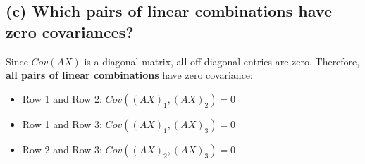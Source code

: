 \documentclass[11pt]{article}
\begin{document}
\subsection*{(c) Which pairs of linear combinations have zero covariances?}
Since $Cov(AX)$ is a diagonal matrix, all off-diagonal entries are zero. Therefore, \textbf{all pairs of linear combinations} have zero covariance:
\begin{itemize}
    \item Row 1 and Row 2: $Cov((AX)_1, (AX)_2) = 0$
    \item Row 1 and Row 3: $Cov((AX)_1, (AX)_3) = 0$
    \item Row 2 and Row 3: $Cov((AX)_2, (AX)_3) = 0$
\end{itemize}
\end{document}
